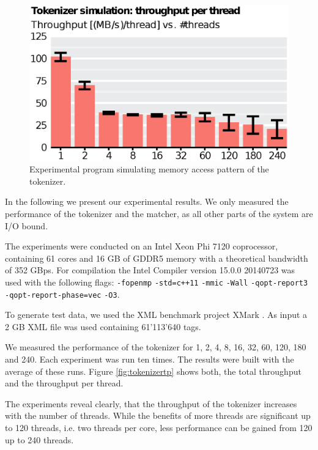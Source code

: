 \begin{figure}
    \includegraphics[scale=.45]{img/def/tokenizer_sim.eps} 
    \caption{Experimental program simulating memory access pattern of the
    tokenizer.}
    \label{fig:tokenizersim}
\end{figure}


In the following we present our experimental results. We only measured the
performance of the tokenizer and the matcher, as all other parts of the system
are I/O bound.

 The experiments were conducted on an Intel Xeon Phi
7120 coprocessor, containing 61 cores and 16 GB of GDDR5 memory with a
theoretical bandwidth of 352 GBps. For compilation the Intel Compiler version
15.0.0 20140723 was used with the following flags: \verb;-fopenmp;
\verb;-std=c++11; \verb;-mmic; \verb;-Wall; \verb;-qopt-report3; \\
\verb;-qopt-report-phase=vec; \verb;-O3;.

To generate test data, we used the XML benchmark project XMark
\cite{Schmidt2002}. As input a 2 GB XML file was used containing 61'113'640
tags. 

 We measured the performance of the tokenizer for 1, 2, 4, 8, 16,
32, 60, 120, 180 and 240. Each experiment was run ten times. The results were
built with the average of these runs. Figure \ref{fig:tokenizertp} shows both,
the total throughput and the throughput per thread.

The experiments reveal clearly, that the throughput of the tokenizer increases
with the number of threads. While the benefits of more threads are significant
up to 120 threads, i.e. two threads per core, less performance can be gained
from 120 up to 240 threads.

